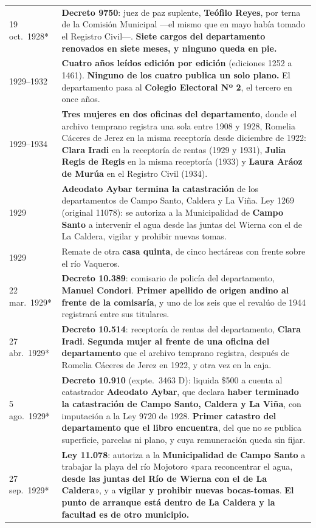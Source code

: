 \begin{longtable}{@{}p{2.7cm}p{10.3cm}@{}}
19 oct.\ 1928* & \textbf{Decreto 9750}: juez de paz suplente, \textbf{Teófilo Reyes}, por terna de la Comisión Municipal ---el mismo que en mayo había tomado el Registro Civil---. \textbf{Siete cargos del departamento renovados en siete meses, y ninguno queda en pie.} \\
1929--1932 & \textbf{Cuatro años leídos edición por edición} (ediciones 1252 a 1461). \textbf{Ninguno de los cuatro publica un solo plano.} El departamento pasa al \textbf{Colegio Electoral Nº 2}, el tercero en once años. \\
1929--1934 & \textbf{Tres mujeres en dos oficinas del departamento}, donde el archivo temprano registra una sola entre 1908 y 1928, Romelia Cáceres de Jerez en la misma receptoría desde diciembre de 1922: \textbf{Clara Iradi} en la receptoría de rentas (1929 y 1931), \textbf{Julia Regis de Regis} en la misma receptoría (1933) y \textbf{Laura Aráoz de Murúa} en el Registro Civil (1934). \\
1929 & \textbf{Adeodato Aybar\index{Aybar, Adeodato} termina la catastración} de los departamentos de Campo Santo, Caldera y La Viña. Ley 1269 (original 11078): se autoriza a la Municipalidad de \textbf{Campo Santo} a intervenir el agua desde las juntas del Wierna con el de La Caldera, vigilar y prohibir nuevas tomas. \\
1929 & Remate de otra \textbf{casa quinta}, de cinco hectáreas con frente sobre el río Vaqueros. \\
22 mar.\ 1929* & \textbf{Decreto 10.389}: comisario de policía del departamento, \textbf{Manuel Condori}. \textbf{Primer apellido de origen andino al frente de la comisaría}, y uno de los seis que el revalúo de 1944 registrará entre sus titulares. \\
27 abr.\ 1929* & \textbf{Decreto 10.514}: receptoría de rentas del departamento, \textbf{Clara Iradi}. \textbf{Segunda mujer al frente de una oficina del departamento} que el archivo temprano registra, después de Romelia Cáceres de Jerez en 1922, y otra vez en la caja. \\
5 ago.\ 1929* & \textbf{Decreto 10.910} (expte.\ 3463 D): liquida \$500 a cuenta al catastrador \textbf{Adeodato Aybar}, que declara \textbf{haber terminado la catastración de Campo Santo, Caldera y La Viña}, con imputación a la Ley 9720 de 1928. \textbf{Primer catastro del departamento que el libro encuentra}, del que no se publica superficie, parcelas ni plano, y cuya remuneración queda sin fijar. \\
27 sep.\ 1929* & \textbf{Ley 11.078}: autoriza a la \textbf{Municipalidad de Campo Santo} a trabajar la playa del río Mojotoro «para reconcentrar el agua, \textbf{desde las juntas del Río de Wierna con el de La Caldera}», y a \textbf{vigilar y prohibir nuevas bocas-tomas}. \textbf{El punto de arranque está dentro de La Caldera y la facultad es de otro municipio.} \\

\end{longtable}
